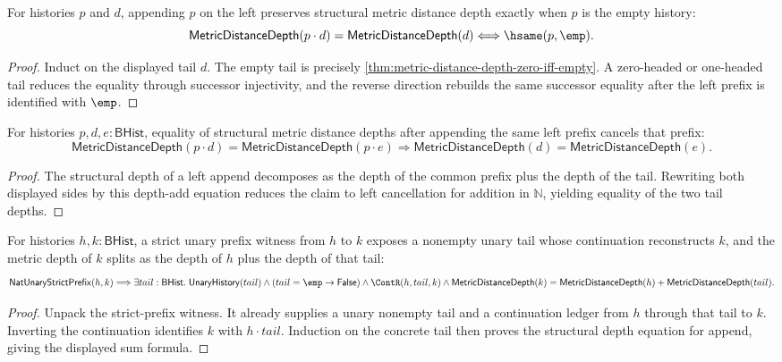 \begin{theorem}
\label{thm:metric-distance-depth-append-left-eq-iff-empty}
For histories $p$ and $d$, appending $p$ on the left preserves structural
metric distance depth exactly when $p$ is the empty history:
$$
\mathsf{MetricDistanceDepth}(p\cdot d)=\mathsf{MetricDistanceDepth}(d)
\Longleftrightarrow
\hsame(p,\emp).
$$
\end{theorem}
\begin{proof}
Induct on the displayed tail $d$. The empty tail is precisely
\autoref{thm:metric-distance-depth-zero-iff-empty}. A zero-headed or one-headed
tail reduces the equality through successor injectivity, and the reverse
direction rebuilds the same successor equality after the left prefix is
identified with $\emp$.
\end{proof}

\begin{theorem}
\label{thm:metric-distance-depth-append-left-cancel}
For histories $p,d,e:\mathsf{BHist}$, equality of structural metric distance
depths after appending the same left prefix cancels that prefix:
$$
\mathsf{MetricDistanceDepth}(p\cdot d)
=
\mathsf{MetricDistanceDepth}(p\cdot e)
\Longrightarrow
\mathsf{MetricDistanceDepth}(d)=\mathsf{MetricDistanceDepth}(e).
$$
\end{theorem}
\begin{proof}
The structural depth of a left append decomposes as the depth of the common
prefix plus the depth of the tail. Rewriting both displayed sides by this
depth-add equation reduces the claim to left cancellation for addition in
\(\mathbb{N}\), yielding equality of the two tail depths.
\end{proof}

\begin{theorem}
\label{thm:metric-distance-depth-strict-prefix-decomposes}
For histories $h,k:\mathsf{BHist}$, a strict unary prefix witness from $h$ to
$k$ exposes a nonempty unary tail whose continuation reconstructs $k$, and the
metric depth of $k$ splits as the depth of $h$ plus the depth of that tail:
$$
\mathsf{NatUnaryStrictPrefix}(h,k)
\Longrightarrow
\exists tail:\mathsf{BHist}.\;
\mathsf{UnaryHistory}(tail)\land (tail=\emp\to\mathsf{False})\land
\ContR(h,tail,k)\land
\mathsf{MetricDistanceDepth}(k)
=
\mathsf{MetricDistanceDepth}(h)+\mathsf{MetricDistanceDepth}(tail).
$$
\end{theorem}
\begin{proof}
Unpack the strict-prefix witness. It already supplies a unary nonempty tail
and a continuation ledger from $h$ through that tail to $k$. Inverting the
continuation identifies $k$ with $h\cdot tail$. Induction on the concrete tail
then proves the structural depth equation for append, giving the displayed
sum formula.
\end{proof}

